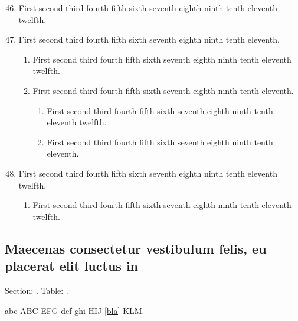\documentclass[a4paper]{book}
\begin{document}
\begin{enumerate}
\setcounter{enumi}{45}
\item First second third fourth fifth sixth seventh eighth ninth tenth
eleventh twelfth.

\item First second third fourth fifth sixth seventh eighth ninth tenth
eleventh.

  \begin{enumerate}
\item First second third fourth fifth sixth seventh eighth ninth tenth
eleventh twelfth.

\item First second third fourth fifth sixth seventh eighth ninth tenth
eleventh.

    \begin{enumerate}
\item First second third fourth fifth sixth seventh eighth ninth tenth
eleventh twelfth.

\item First second third fourth fifth sixth seventh eighth ninth tenth
  eleventh.
    \end{enumerate}
  \end{enumerate}

\item First second third fourth fifth sixth seventh eighth ninth tenth
eleventh twelfth.

    \begin{enumerate}
\item First second third fourth fifth sixth seventh eighth ninth tenth
eleventh twelfth.

  \end{enumerate}
\end{enumerate}

\newpage

\subsection{Maecenas consectetur vestibulum felis, eu placerat elit luctus in}

Section: \thesection. Table: \thetable.

\bigskip

abc \foreignlanguage{hebrew}{ABC  EFG} def
 ghi \foreignlanguage{hebrew}{HIJ \ref{bla} KLM}. 

\bigskip
\end{document}
